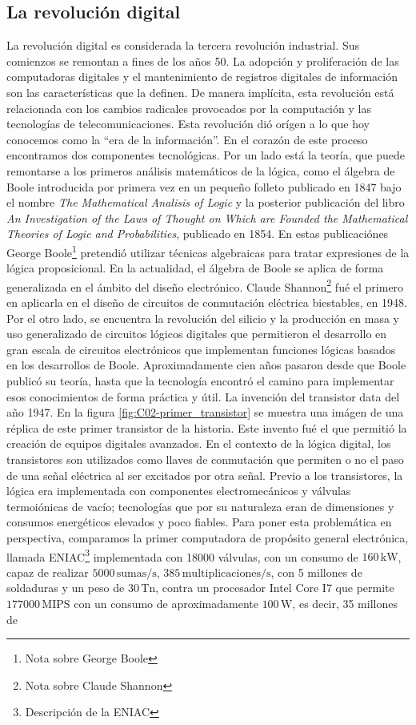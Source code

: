 \subsection{La revolución digital}

La revolución digital es considerada la tercera revolución industrial. Sus comienzos se remontan a fines de los años 50. La adopción y proliferación de las computadoras digitales y el mantenimiento de registros digitales de información son las características que la definen. De manera implícita, esta revolución está relacionada con los cambios radicales provocados por la computación y las tecnologías de telecomunicaciones. Esta revolución dió orígen a lo que hoy conocemos como la ``era de la información''. En el corazón de este proceso encontramos dos componentes tecnológicas. Por un lado está la teoría, que puede remontarse a los primeros análisis matemáticos de la lógica, como el álgebra de Boole introducida por primera vez en un pequeño folleto publicado en 1847 bajo el nombre \emph{The Mathematical Analisis of Logic} y la posterior publicación del libro \emph{An Investigation of the Laws of Thought on Which are Founded the Mathematical Theories of Logic and Probabilities}, publicado en 1854. En estas publicaciónes George Boole\footnote{Nota sobre George Boole} pretendió utilizar técnicas algebraicas para tratar expresiones de la lógica proposicional. En la actualidad, el álgebra de Boole se aplica de forma generalizada en el ámbito del diseño electrónico. Claude Shannon\footnote{Nota sobre Claude Shannon} fué el primero en aplicarla en el diseño de circuitos de conmutación eléctrica biestables, en 1948. Por el otro lado, se encuentra la revolución del silicio y la producción en masa y uso generalizado de circuitos lógicos digitales que permitieron el desarrollo en gran escala de circuitos electrónicos que implementan funciones lógicas basados en los desarrollos de Boole. Aproximadamente cien años pasaron desde que Boole publicó su teoría, hasta que la tecnología encontró el camino para implementar esos conocimientos de forma práctica y útil. La invención del transistor data del año 1947. En la figura \ref{fig:C02-primer_transistor} se muestra una imágen de una réplica de este primer transistor de la historia. Este invento fué el que permitió la creación de equipos digitales avanzados. En el contexto de la lógica digital, los transistores son utilizados como llaves de conmutación que permiten o no el paso de una señal eléctrica al ser excitados por otra señal. Previo a los transistores, la lógica era implementada con componentes electromecánicos y válvulas termoiónicas de vacío; tecnologías que por su naturaleza eran de dimensiones y consumos energéticos elevados y poco fiables. Para poner esta problemática en perspectiva, comparamos la primer computadora de propósito general electrónica, llamada ENIAC\footnote{Descripción de la ENIAC} implementada con 18000 válvulas, con un consumo de $160\,\mathrm{kW}$, capaz de realizar $5000\,\mathrm{sumas/s}$, $385\,\mathrm{multiplicaciones/s}$, con 5 millones de soldaduras y un peso de $30\,\mathrm{Tn}$, contra un procesador Intel Core I7 que permite $177000\,\mathrm{MIPS}$ con un consumo de aproximadamente $100\,\mathrm{W}$, es decir, 35 millones de 